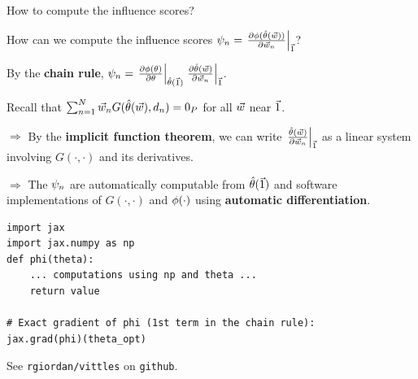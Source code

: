 \begin{frame}[fragile]{How to compute the influence scores?}

How can we compute the influence scores
%
%
$
\infl_n =
\fracat{\partial \thetafun(\thetahat(\w))}
       {\partial\w_n}{\onevec}
%
$?
%

\vspace{1em}
By the \textbf{chain rule},
$
\infl_n =
\fracat{\partial \thetafun(\theta)}
      {\partial\theta}{\thetahat(\onevec)}
\fracat{\partial \thetahat(\w)}
    {\partial\w_n}{\onevec}
%
$.

\vspace{1em}
Recall that
$\sum_{n=1}^N \vec{w}_n G(\hat{\theta}(\vec{w}), d_{n}) =  0_{P}$ for all $\vec{w}$ near $\vec{1}$.


\vspace{1em}
$\Rightarrow$
By the \textbf{implicit function theorem}, we can write
$\left.\frac{\hat{\theta}(\vec{w})}{\partial\vec{w}_n}\right|_{\vec{1}}$ as a linear system
involving $G(\cdot, \cdot)$ and its derivatives.

\vspace{1em}
$\Rightarrow$
The $\psi_n$ are automatically computable from $\hat{\theta}(\vec{1})$ and
software implementations of $G(\cdot, \cdot)$ and $\phi(\cdot)$
using \textbf{automatic differentiation}.



\begin{lstlisting}
import jax
import jax.numpy as np
def phi(theta):
    ... computations using np and theta ...
    return value

# Exact gradient of phi (1st term in the chain rule):
jax.grad(phi)(theta_opt)
\end{lstlisting}

See \texttt{rgiordan/vittles} on \texttt{github}.

\end{frame}



